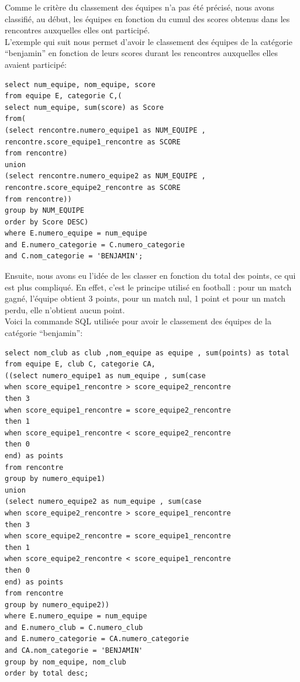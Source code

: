 \documentclass{article}
\begin{document}
Comme le critère du classement des équipes n'a pas été précisé, nous avons classifié, au début, les équipes en fonction du cumul des scores obtenus dans les rencontres auxquelles elles ont participé. \\
L'exemple qui suit nous permet d'avoir le classement des équipes de la catégorie ``benjamin'' en fonction de leurs scores durant les rencontres auxquelles elles avaient participé: \\

\begin{verbatim}
select num_equipe, nom_equipe, score
from equipe E, categorie C,(
select num_equipe, sum(score) as Score
from(
(select rencontre.numero_equipe1 as NUM_EQUIPE , rencontre.score_equipe1_rencontre as SCORE
from rencontre)
union
(select rencontre.numero_equipe2 as NUM_EQUIPE , rencontre.score_equipe2_rencontre as SCORE
from rencontre))
group by NUM_EQUIPE
order by Score DESC)
where E.numero_equipe = num_equipe
and E.numero_categorie = C.numero_categorie
and C.nom_categorie = 'BENJAMIN';
\end{verbatim}

Ensuite, nous avons eu l'idée de les classer en fonction du total des points, ce qui est plus compliqué. En effet, c'est le principe utilisé en football : pour un match gagné, l'équipe obtient 3 points, pour un match nul, 1 point et pour un match perdu, elle n'obtient aucun point.  \\
Voici la commande SQL utilisée pour avoir le classement des équipes de la catégorie ``benjamin'': \\

\begin{verbatim}
select nom_club as club ,nom_equipe as equipe , sum(points) as total
from equipe E, club C, categorie CA,
((select numero_equipe1 as num_equipe , sum(case
when score_equipe1_rencontre > score_equipe2_rencontre 
then 3
when score_equipe1_rencontre = score_equipe2_rencontre 
then 1
when score_equipe1_rencontre < score_equipe2_rencontre
then 0
end) as points
from rencontre
group by numero_equipe1)
union
(select numero_equipe2 as num_equipe , sum(case
when score_equipe2_rencontre > score_equipe1_rencontre 
then 3
when score_equipe2_rencontre = score_equipe1_rencontre 
then 1
when score_equipe2_rencontre < score_equipe1_rencontre
then 0
end) as points
from rencontre
group by numero_equipe2))
where E.numero_equipe = num_equipe
and E.numero_club = C.numero_club
and E.numero_categorie = CA.numero_categorie
and CA.nom_categorie = 'BENJAMIN'   
group by nom_equipe, nom_club
order by total desc;
\end{verbatim}
\end{document}
